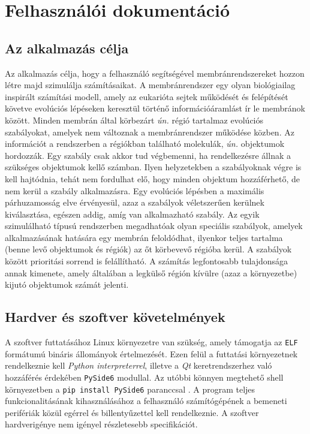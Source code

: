 \chapter{Felhasználói dokumentáció}
\label{ch:user}


\section{Az alkalmazás célja}

Az alkalmazás célja, hogy a felhasználó segítségével membránrendszereket hozzon létre majd szimulálja számításaikat. A membránrendszer egy olyan biológiailag inspirált számítási modell, amely az eukarióta sejtek működését és felépítését követve evolúciós lépéseken keresztül történő információáramlást ír le membránok között. Minden membrán által körbezárt \textit{ún.} régió tartalmaz evolúciós szabályokat, amelyek nem változnak a membránrendszer működése közben. Az információt a rendszerben a régiókban található molekulák, \textit{ún.} objektumok hordozzák. Egy szabály csak akkor tud végbemenni, ha rendelkezésre állnak a szükséges objektumok kellő számban. Ilyen helyzetekben a szabályoknak végre is kell hajtódnia, tehát nem fordulhat elő, hogy minden objektum hozzáférhető, de nem kerül a szabály alkalmazásra. Egy evolúciós lépésben a maximális párhuzamosság elve érvényesül, azaz a szabályok véletszerűen kerülnek kiválasztása, egészen addig, amíg van alkalmazható szabály. Az egyik szimulálható típusú rendszerben megadhatóak olyan speciális szabályok, amelyek alkalmazásának hatására egy membrán feloldódhat, ilyenkor teljes tartalma (benne levő objektumok és régiók) az őt körbevevő régióba kerül. A szabályok között prioritási sorrend is felállítható. A számítás legfontosabb tulajdonsága annak kimenete, amely általában a legkülső régión kívülre (azaz a környezetbe) kijutó objektumok számát jelenti.


\section{Hardver és szoftver követelmények}

A szoftver futtatásához Linux környezetre van szükség, amely támogatja az \verb|ELF| formátumú bináris állományok értelmezését. Ezen felül a futtatási környezetnek rendelkeznie kell \textit{Python interpreterrel}, illetve a \textit{Qt} keretrendszerhez való hozzáférés érdekében \verb|PySide6| modullal. Az utóbbi könnyen megtehető shell környezetben a \verb|pip install PySide6| paranccsal . A program teljes funkcionalitásának kihasználásához a felhasználó számítógépének a bemeneti perifériák közül egérrel és billentyűzettel kell rendelkeznie. A szoftver hardverigénye nem igényel részletesebb specifikációt.


